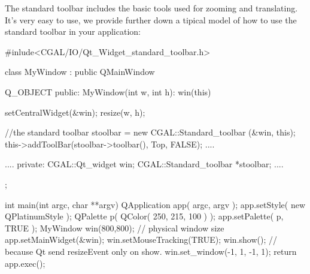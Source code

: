 The standard toolbar includes the basic tools used for zooming and translating.
It's very easy to use, we provide further down a tipical model of how to use 
the standard toolbar in your application:
\begin{ccExampleCode}
#inlude<CGAL/IO/Qt_Widget_standard_toolbar.h>

class MyWindow : public QMainWindow
{
  Q_OBJECT
public:
  MyWindow(int w, int h): win(this) {
    setCentralWidget(&win);
    resize(w, h);
    
    //the standard toolbar
    stoolbar = new CGAL::Standard_toolbar (&win, this);
    this->addToolBar(stoolbar->toolbar(), Top, FALSE);
   ....
  }
  ....
private:
  CGAL::Qt_widget	  win;
  CGAL::Standard_toolbar  *stoolbar;
  ....
};

int
main(int argc, char **argv)
{
  QApplication app( argc, argv );
    app.setStyle( new QPlatinumStyle );
    QPalette p( QColor( 250, 215, 100 ) );
    app.setPalette( p, TRUE );
  MyWindow win(800,800); // physical window size
  app.setMainWidget(&win);
  win.setMouseTracking(TRUE);
  win.show();
  // because Qt send resizeEvent only on show.
  win.set_window(-1, 1, -1, 1);
  return app.exec();
}
\end{ccExampleCode}










